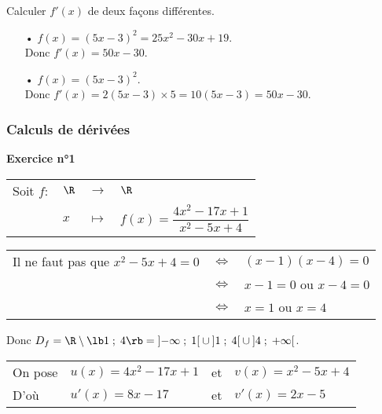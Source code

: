 Calculer $f'(x)$ de deux façons différentes. \\

\begin{itemize}
\item[•] $f(x) = \left(5x - 3\right)^2 = 25x^2 - 30x + 19$. \\

Donc $f'(x) = 50x - 30$. \\

\item[•] $f(x) = \left(5x - 3\right)^2$. \\

Donc $f'(x) = 2\left(5x - 3\right) \times 5 = 10\left(5x - 3\right) = 50x - 30$.
\end{itemize}

\newpage

\subsubsection{Calculs de dérivées}

\textbf{Exercice n°1} \\

\begin{tabular}{llll}
\hspace{-.3cm} Soit $f:$ & $\R$ & $\longrightarrow$ & $\R$ \\
& $x$ & $\longmapsto$ & $f(x) = \dfrac{4x^2 - 17x+1}{x^2 - 5x + 4}$ \\
\end{tabular}

\vspace*{.3cm}

\begin{tabular}{lll}
\hspace*{-.3cm} Il ne faut pas que $x^2 - 5x + 4 = 0$ & $\Longleftrightarrow$ & $\left(x-1\right)\left(x-4\right) = 0$ \\
& $\Longleftrightarrow$ & $x-1 = 0$ ou $x-4 = 0$ \\
& $\Longleftrightarrow$ & $x = 1$ ou $x=4$ \\
\end{tabular}

\vspace*{.3cm}

Donc $D_f = \R \setminus \lb 1 \; ; \; 4 \rb = \left]-\infty \; ; \; 1 \right[\cup \left]1 \; ; \; 4\right[ \cup \left]4 \; ; \; +\infty\right[$. \\

\begin{tabular}{llll}
\hspace{-.3cm} On pose & $u(x) = 4x^2 - 17x + 1$ & et & $v(x) = x^2 - 5x + 4$ \\
\hspace{-.3cm} D'où & $u'(x) = 8x - 17$ & et & $v'(x) = 2x - 5$ \\
\end{tabular}

